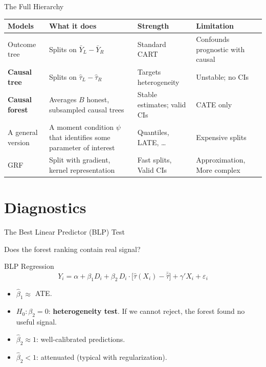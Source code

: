 \documentclass[aspectratio=169, 11pt, handout]{beamer}
\begin{document}
\begin{frame}{The Full Hierarchy}
 
\begin{center}
\small
\begin{tabular}{p{3cm}p{3.8cm}p{3cm}p{2.5cm}}
\toprule
\textbf{Models} & \textbf{What it does} & \textbf{Strength} & \textbf{Limitation} \\
\midrule
Outcome tree & Splits on $\bar{Y}_L - \bar{Y}_R$ & Standard CART & Confounds prognostic with causal \\[0.3em]
\textbf{Causal tree} & Splits on $\hat{\tau}_L - \hat{\tau}_R$ & Targets heterogeneity & Unstable; no CIs \\[0.3em]
\textbf{Causal forest} & Averages $B$ honest, subsampled causal trees & Stable estimates; valid CIs & CATE only \\[0.3em]
A general version & A moment condition $\psi$ that identifies some parameter of interest & Quantiles, LATE, \ldots & Expensive splits \\[0.3em]
GRF & Split with gradient, kernel representation & Fast splits, Valid CIs & Approximation, More complex \\
\bottomrule
\end{tabular}
\end{center}
 
\end{frame}
 
 
\section{Diagnostics}
 
\begin{frame}{The Best Linear Predictor (BLP) Test}
 
Does the forest ranking contain real signal?
 
\bigskip
 
\begin{block}{BLP Regression}
\[
Y_i = \alpha + \beta_1 D_i + \beta_2\, D_i \cdot \bigl[\hat{\tau}(X_i) - \bar{\hat{\tau}}\bigr] + \gamma' X_i + \varepsilon_i
\]
\end{block}
 
\pause
\bigskip
 
\begin{itemize}
    \item $\hat{\beta}_1 \approx$ ATE.
    \pause
    \item $H_0: \beta_2 = 0$: \textbf{heterogeneity test}. If we cannot reject, the forest found no useful signal.
    \pause
    \item $\hat{\beta}_2 \approx 1$: well-calibrated predictions.
    \item $\hat{\beta}_2 < 1$: attenuated (typical with regularization).
\end{itemize}
 
\end{frame}
 
\end{document}
